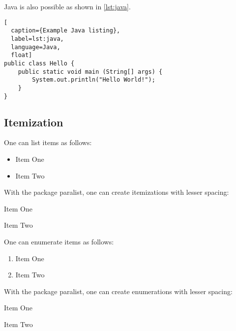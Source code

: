 \documentclass[sigconf,balance]{acmart}
\begin{document}
Java is also possible as shown in \cref{lst:java}.

\begin{ltgexample}
\begin{lstlisting}[
  caption={Example Java listing},
  label=lst:java,
  language=Java,
  float]
public class Hello {
    public static void main (String[] args) {
        System.out.println("Hello World!");
    }
}
\end{lstlisting}
\end{ltgexample}

\subsection{Itemization}

One can list items as follows:

\begin{ltgexample}
\begin{itemize}
  \item Item One
  \item Item Two
\end{itemize}
\end{ltgexample}

With the package paralist, one can create itemizations with lesser spacing:

\begin{ltgexample}
\begin{compactitem}
  \item Item One
  \item Item Two
\end{compactitem}
\end{ltgexample}

One can enumerate items as follows:

\begin{ltgexample}
\begin{enumerate}
  \item Item One
  \item Item Two
\end{enumerate}
\end{ltgexample}

With the package paralist, one can create enumerations with lesser spacing:

\begin{ltgexample}
\begin{compactenum}
  \item Item One
  \item Item Two
\end{compactenum}
\end{ltgexample}
\end{document}
